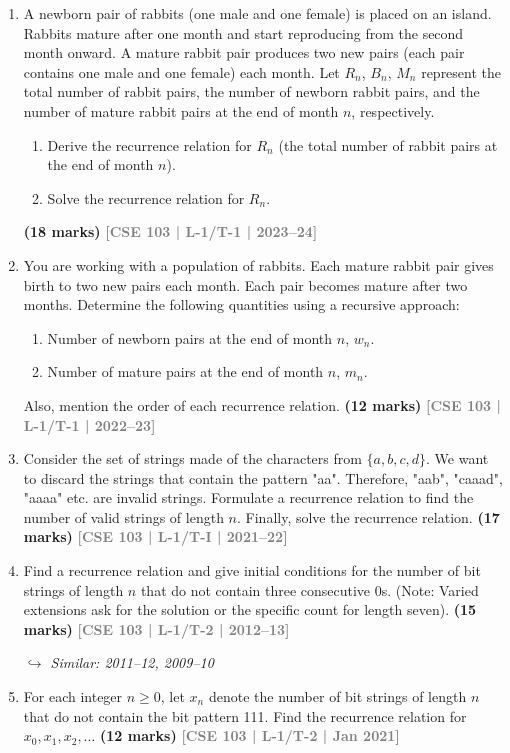 \documentclass[12pt,a3paper]{article}
\newcommand{\yr}[1]{\hfill\textcolor{gray}{\small\textbf{[#1]}}}
\newcommand{\mk}[1]{\textcolor{orange!70!black}{\small\textbf{(#1 marks)}}}
\newcommand{\variant}[1]{\par\vspace{1pt}\textcolor{blue!50!black}%
  {\footnotesize\textit{$\hookrightarrow$ Similar: #1}}}
\begin{document}
\begin{enumerate}

\item A newborn pair of rabbits (one male and one female) is placed on an island. Rabbits mature after one month and start reproducing from the second month onward. A mature rabbit pair produces two new pairs (each pair contains one male and one female) each month. Let $R_n$, $B_n$, $M_n$ represent the total number of rabbit pairs, the number of newborn rabbit pairs, and the number of mature rabbit pairs at the end of month $n$, respectively.
\begin{enumerate}
  \item Derive the recurrence relation for $R_n$ (the total number of rabbit pairs at the end of month $n$).
  \item Solve the recurrence relation for $R_n$.
\end{enumerate}
\mk{18} \yr{CSE 103 | L-1/T-1 | 2023--24}

\item You are working with a population of rabbits. Each mature rabbit pair gives birth to two new pairs each month. Each pair becomes mature after two months. Determine the following quantities using a recursive approach:
\begin{enumerate}
  \item Number of newborn pairs at the end of month $n$, $w_n$.
  \item Number of mature pairs at the end of month $n$, $m_n$.
\end{enumerate}
Also, mention the order of each recurrence relation.
\mk{12} \yr{CSE 103 | L-1/T-1 | 2022--23}

\item Consider the set of strings made of the characters from $\{a, b, c, d\}$. We want to discard the strings that contain the pattern "aa". Therefore, "aab", "caaad", "aaaa" etc. are invalid strings. Formulate a recurrence relation to find the number of valid strings of length $n$. Finally, solve the recurrence relation.
\mk{17} \yr{CSE 103 | L-1/T-I | 2021--22}  

\item Find a recurrence relation and give initial conditions for the number of bit strings of length $n$ that do not contain three consecutive 0s. (Note: Varied extensions ask for the solution or the specific count for length seven).
\mk{15} \yr{CSE 103 | L-1/T-2 | 2012--13} \variant{2011--12, 2009--10}

\item For each integer $n \geq 0$, let $x_n$ denote the number of bit strings of length $n$ that do not contain the bit pattern 111. Find the recurrence relation for $x_0, x_1, x_2, \ldots$
\mk{12} \yr{CSE 103 | L-1/T-2 | Jan 2021}  


\end{enumerate}
\end{document}
